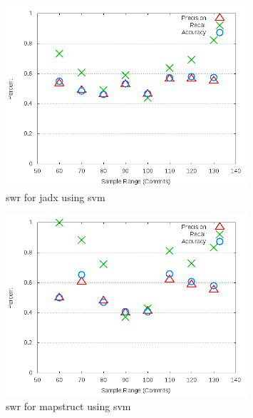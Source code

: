\begin{figure}[!t]
\centering
\includegraphics[width=0.8\textwidth]{images/svm/test_1/jadx_sample_range.png}
\caption{\gls{swr} for jadx using \gls{svm}}
\label{fig:test_1_jadx_svm}
\end{figure}

\begin{figure}[!t]
\centering
\includegraphics[width=0.8\textwidth]{images/svm/test_1/mapstruct_sample_range.png}
\caption{\gls{swr} for mapstruct using \gls{svm}}
\label{fig:test_1_mapstruct_svm}
\end{figure}

